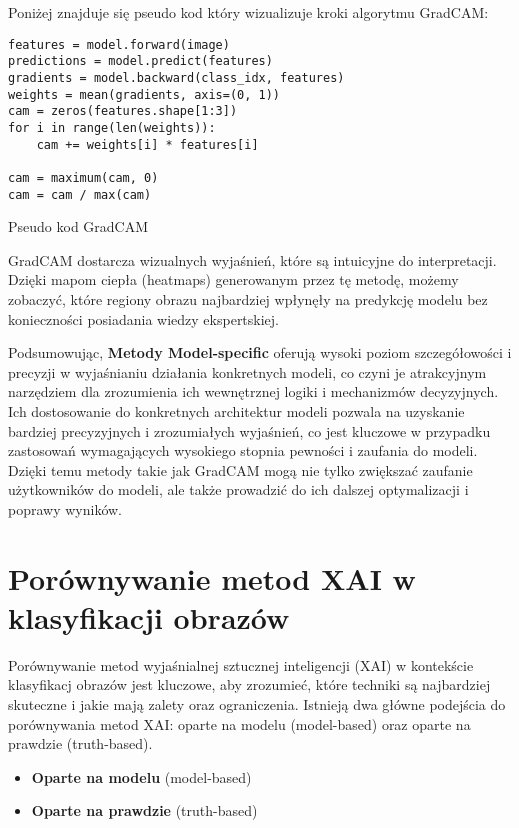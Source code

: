 Poniżej znajduje się pseudo kod który wizualizuje kroki algorytmu GradCAM:

\begin{listing}
	\begin{verbatim}
features = model.forward(image)
predictions = model.predict(features)
gradients = model.backward(class_idx, features)
weights = mean(gradients, axis=(0, 1))
cam = zeros(features.shape[1:3])
for i in range(len(weights)):
    cam += weights[i] * features[i]

cam = maximum(cam, 0)
cam = cam / max(cam)
    \end{verbatim}
	\caption{Pseudo kod GradCAM} \label{listing:gradcam}
\end{listing}

GradCAM dostarcza  wizualnych wyjaśnień, które są intuicyjne do interpretacji.
Dzięki mapom ciepła (heatmaps) generowanym przez tę metodę, możemy zobaczyć, które regiony obrazu najbardziej wpłynęły na predykcję modelu bez konieczności posiadania wiedzy ekspertskiej.

\vspace{1cm}

Podsumowując, \textbf{Metody Model-specific} oferują wysoki poziom szczegółowości i precyzji w wyjaśnianiu działania konkretnych modeli, co czyni je atrakcyjnym narzędziem dla zrozumienia ich wewnętrznej logiki i mechanizmów decyzyjnych.
Ich dostosowanie do konkretnych architektur modeli pozwala na uzyskanie bardziej precyzyjnych i zrozumiałych wyjaśnień, co jest kluczowe w przypadku zastosowań wymagających wysokiego stopnia pewności i zaufania do modeli.
Dzięki temu metody takie jak GradCAM mogą nie tylko zwiększać zaufanie użytkowników do modeli, ale także prowadzić do ich dalszej optymalizacji i poprawy wyników.

\section*{Porównywanie metod XAI w klasyfikacji obrazów}
Porównywanie metod wyjaśnialnej sztucznej inteligencji (XAI) w kontekście klasyfikacj obrazów jest kluczowe, aby zrozumieć, które techniki są najbardziej skuteczne i jakie mają zalety oraz ograniczenia.
Istnieją dwa główne podejścia do porównywania metod XAI: oparte na modelu (model-based) oraz oparte na prawdzie (truth-based).
\begin{itemize}
	\item \textbf{Oparte na modelu} (model-based)
	\item \textbf{Oparte na prawdzie} (truth-based)
\end{itemize}

